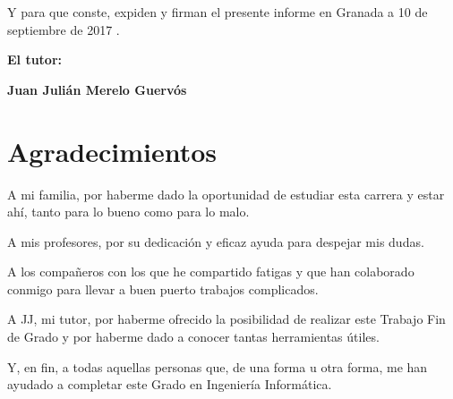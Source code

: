 \vspace{0.5cm}

Y para que conste, expiden y firman el presente informe en Granada a 10 de septiembre de 2017 .

\vspace{1cm}

\textbf{El tutor:}

\vspace{5cm}

\noindent \textbf{Juan Julián Merelo Guervós}

\chapter*{Agradecimientos}
\thispagestyle{empty}

       \vspace{1cm}


A mi familia, por haberme dado la oportunidad de estudiar esta carrera y estar ahí, tanto para lo bueno como para lo malo.\par
\medskip
A mis profesores, por su dedicación y eficaz ayuda para despejar mis dudas.\par
\medskip
A los compañeros con los que he compartido fatigas y que han colaborado conmigo para llevar a buen puerto trabajos complicados.\par
\medskip
A JJ, mi tutor, por haberme ofrecido la posibilidad de realizar este Trabajo Fin de Grado y por haberme dado a conocer tantas herramientas útiles.\par
\medskip
Y, en fin, a todas aquellas personas que, de una forma u otra forma, me han ayudado a completar este Grado en Ingeniería Informática.\par
\medskip
